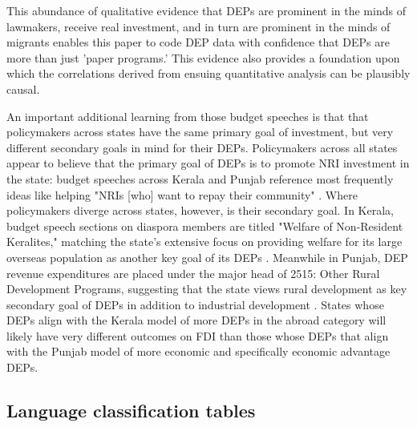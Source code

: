 \documentclass[12pt]{article}
\let\oldsubsection\subsection
\renewcommand{\subsection}{\FloatBarrier\oldsubsection}
\begin{document}
    This abundance of qualitative evidence that DEPs are prominent in the minds of lawmakers, receive real investment, and in turn are prominent in the minds of migrants enables this paper to code DEP data with confidence that DEPs are more than just 'paper programs.' This evidence also provides a foundation upon which the correlations derived from ensuing quantitative analysis can be plausibly causal.
    
    An important additional learning from those budget speeches is that that policymakers across states have the same primary goal of investment, but very different secondary goals in mind for their DEPs. Policymakers across all states appear to believe that the primary goal of DEPs is to promote NRI investment in the state: budget speeches across Kerala and Punjab reference most frequently ideas like helping "NRIs [who] want to repay their community" \citep{singh_badal_speech_2017}. Where policymakers diverge across states, however, is their secondary goal. In Kerala, budget speech sections on diaspora members are titled "Welfare of Non-Resident Keralites," matching the state's extensive focus on providing welfare for its large overseas population as another key goal of its DEPs \citep{isaac_government_2016}. Meanwhile in Punjab, DEP revenue expenditures are placed under the major head of 2515: Other Rural Development Programs, suggesting that the state views rural development as key secondary goal of DEPs in addition to industrial development \citep{finance_department_punjab_detailed_2013}. States whose DEPs align with the Kerala model of more DEPs in the abroad category will likely have very different outcomes on FDI than those whose DEPs that align with the Punjab model of more economic and specifically economic advantage DEPs.

\subsection{Language classification tables}
\end{document}
